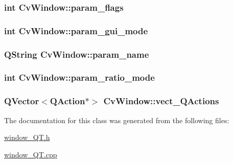 \hypertarget{classCvWindow_ae79962eeb12c2dbcedafb23362ba1847}{
\subsubsection[{param\-\_\-flags}]{\setlength{\rightskip}{0pt plus 5cm}int Cv\-Window\-::param\-\_\-flags}}\label{classCvWindow_ae79962eeb12c2dbcedafb23362ba1847}
\hypertarget{classCvWindow_a1503f81d43bec919c329a1c98cb3f559}{
\subsubsection[{param\-\_\-gui\-\_\-mode}]{\setlength{\rightskip}{0pt plus 5cm}int Cv\-Window\-::param\-\_\-gui\-\_\-mode}}\label{classCvWindow_a1503f81d43bec919c329a1c98cb3f559}
\hypertarget{classCvWindow_a2f2e2a14703dbe479049862f5f43ac13}{
\subsubsection[{param\-\_\-name}]{\setlength{\rightskip}{0pt plus 5cm}Q\-String Cv\-Window\-::param\-\_\-name}}\label{classCvWindow_a2f2e2a14703dbe479049862f5f43ac13}
\hypertarget{classCvWindow_a9d97fe990d3fb23daa031ac39483b059}{
\subsubsection[{param\-\_\-ratio\-\_\-mode}]{\setlength{\rightskip}{0pt plus 5cm}int Cv\-Window\-::param\-\_\-ratio\-\_\-mode}}\label{classCvWindow_a9d97fe990d3fb23daa031ac39483b059}
\hypertarget{classCvWindow_a55d09660aba2ef83bf2eaa4fe80bb746}{
\subsubsection[{vect\-\_\-\-Q\-Actions}]{\setlength{\rightskip}{0pt plus 5cm}Q\-Vector$<$Q\-Action$\ast$$>$ Cv\-Window\-::vect\-\_\-\-Q\-Actions}}\label{classCvWindow_a55d09660aba2ef83bf2eaa4fe80bb746}


The documentation for this class was generated from the following files\-:\begin{DoxyCompactItemize}
\item 
\hyperlink{window__QT_8h}{window\-\_\-\-Q\-T.\-h}\item 
\hyperlink{window__QT_8cpp}{window\-\_\-\-Q\-T.\-cpp}\end{DoxyCompactItemize}
